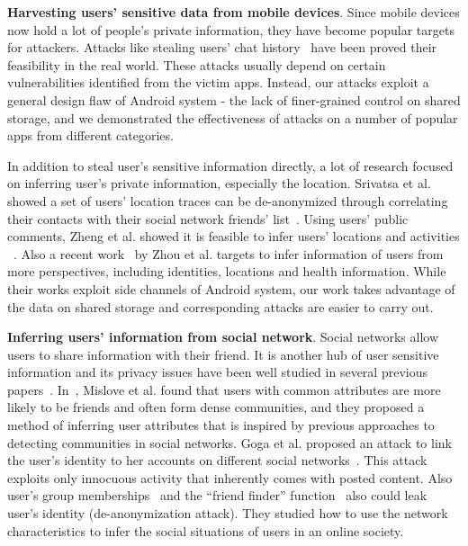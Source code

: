 \documentclass{sig-alternate}
\begin{document}
\noindent\textbf{Harvesting users' sensitive data from mobile devices}. Since mobile devices now hold a lot of people's private information, they have become popular targets for attackers. Attacks like stealing users' chat history~\cite{whatsappuserchat} have been proved their feasibility in the real world. These attacks usually depend on certain vulnerabilities identified from the victim apps. Instead, our attacks exploit a general design flaw of Android system - the lack of finer-grained control on shared storage, and we demonstrated the effectiveness of attacks on a number of popular apps from different categories.


In addition to steal user's sensitive information directly, a lot of research focused on inferring user's private information, especially the location. Srivatsa et al. showed a set of users' location traces can be de-anonymized through correlating their contacts with their social network friends' list~\cite{srivatsa2012deanonymizing}.  Using users' public comments, Zheng et al. showed it is feasible to infer users' locations and activities ~\cite{zheng2010collaborative}.  Also a recent work~\cite{zhou2013identity} by Zhou et al. targets to infer information of users from more perspectives, including identities, locations and health information. While their works exploit side channels of Android system, our work takes advantage of the data on shared storage and corresponding attacks are easier to carry out.



\noindent\textbf{Inferring users' information from social network}. Social networks allow users to share information with their friend. It is another hub of user sensitive information and its privacy issues have been well studied in several previous papers~\cite{mislove2010you, wondracek2010practical, balduzzi2010abusing, goga2013exploiting}. In~\cite{mislove2010you}, Mislove et al. found that users with common attributes are more likely to be friends and often form dense communities, and they proposed a method of inferring user attributes that is inspired by previous approaches to detecting communities in social networks. Goga et al. proposed an attack to link the user's identity to her accounts on different social networks~\cite{goga2013exploiting}. This attack exploits only innocuous activity that inherently comes with posted content. Also user's group memberships~\cite{wondracek2010practical} and the ``friend finder'' function~\cite{balduzzi2010abusing} also could leak user's identity (de-anonymization attack).  They studied how to use the network characteristics to infer the social situations of users in an online society.
\end{document}
